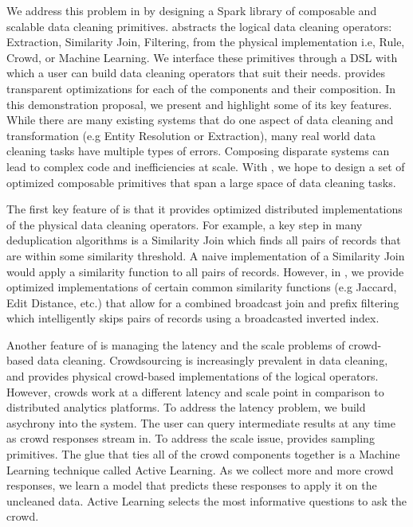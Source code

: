 We address this problem in \projx by designing a Spark library of composable and scalable data cleaning primitives.
\projx abstracts the logical data cleaning operators: Extraction, Similarity Join, Filtering, from the physical implementation i.e, Rule, Crowd, or Machine Learning.
We interface these primitives through a DSL with which a user can build data cleaning operators that suit their needs.
\projx provides transparent optimizations for each of the components and their composition.
In this demonstration proposal, we present \projx and highlight some of its key features.
While there are many existing systems that do one aspect of data cleaning and transformation (e.g Entity Resolution or Extraction), 
many real world data cleaning tasks have multiple types of errors.
Composing disparate systems can lead to complex code and inefficiencies at scale.
With \projx, we hope to design a set of optimized composable primitives that span a large space of data cleaning tasks.

The first key feature of \projx is that it provides optimized distributed implementations 
of the physical data cleaning operators.
For example, a key step in many deduplication algorithms is a Similarity Join which finds all pairs of records that are within some similarity threshold.
A naive implementation of a Similarity Join would apply a similarity function to all pairs of records.
However, in \projx, we provide optimized implementations of certain common similarity functions (e.g Jaccard, Edit Distance, etc.) that allow for 
a combined broadcast join and prefix filtering which intelligently skips pairs of records using a broadcasted inverted index.

Another feature of \projx is managing the latency and the scale problems of crowd-based data cleaning. 
Crowdsourcing is increasingly prevalent in data cleaning, and \projx provides physical crowd-based implementations
of the logical operators.
However, crowds work at a different latency and scale point in comparison to distributed analytics platforms.
To address the latency problem, we build asychrony into the system.
The user can query intermediate results at any time as crowd responses stream in.
To address the scale issue, \projx provides sampling primitives.
The glue that ties all of the crowd components together is a Machine Learning technique called Active Learning.
As we collect more and more crowd responses, we learn a model that predicts these responses to apply it on the uncleaned data.
Active Learning selects the most informative questions to ask the crowd.

